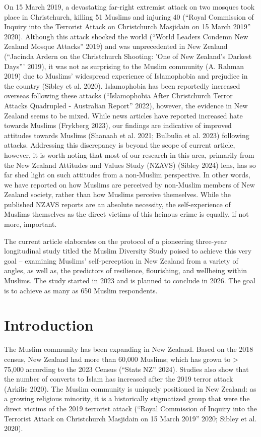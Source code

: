 \documentclass[
]{interact}
\begin{document}
On 15 March 2019, a devastating far-right extremist attack on two
mosques took place in Christchurch, killing 51 Muslims and injuring 40
({``Royal {C}ommission of {I}nquiry into the Terrorist Attack on
{C}hristchurch {M}asjidain on 15 {M}arch 2019''} 2020). Although this
attack shocked the world ({``World Leaders Condemn New Zealand Mosque
Attacks''} 2019) and was unprecedented in New Zealand ({``Jacinda
{A}rdern on the {C}hristchurch Shooting: 'One of {N}ew {Z}ealand's
Darkest Days'''} 2019), it was not as surprising to the Muslim community
(A. Rahman 2019) due to Muslims' widespread experience of Islamophobia
and prejudice in the country (Sibley et al. 2020). Islamophobia has been
reportedly increased overseas following these attacks ({``Islamophobia
After {C}hristchurch Terror Attacks Quadrupled - {A}ustralian Report''}
2022), however, the evidence in New Zealand seems to be mixed. While
news articles have reported increased hate towards Muslims (Frykberg
2023), our findings are indicative of improved attitudes towards Muslims
(Shanaah et al. 2021; Bulbulia et al. 2023) following attacks.
Addressing this discrepancy is beyond the scope of current article,
however, it is worth noting that most of our research in this area,
primarily from the New Zealand Attitudes and Values Study (NZAVS)
(Sibley 2024) lens, has so far shed light on such attitudes from a
non-Muslim perspective. In other words, we have reported on how Muslims
are perceived by non-Muslim members of New Zealand society, rather than
how Muslims perceive themselves. While the published NZAVS reports are
an absolute necessity, the self-experience of Muslims themselves as the
direct victims of this heinous crime is equally, if not more, important.

The current article elaborates on the protocol of a pioneering
three-year longitudinal study titled the Muslim Diversity Study poised
to achieve this very goal -- examining Muslims' self-perception in New
Zealand from a variety of angles, as well as, the predictors of
resilience, flourishing, and wellbeing within Muslims. The study started
in 2023 and is planned to conclude in 2026. The goal is to achieve as
many as 650 Muslim respondents.

\section{Introduction}\label{sec-intro}

The Muslim community has been expanding in New Zealand. Based on the
2018 census, New Zealand had more than 60,000 Muslims; which has grown
to \textgreater{} 75,000 according to the 2023 Census ({``Stats NZ''}
2024). Studies also show that the number of converts to Islam has
increased after the 2019 terror attack (Arkilic 2020). The Muslim
community is uniquely positioned in New Zealand: as a growing religious
minority, it is a historically stigmatized group that were the direct
victims of the 2019 terrorist attack ({``Royal {C}ommission of {I}nquiry
into the Terrorist Attack on {C}hristchurch {M}asjidain on 15 {M}arch
2019''} 2020; Sibley et al. 2020).
\end{document}
